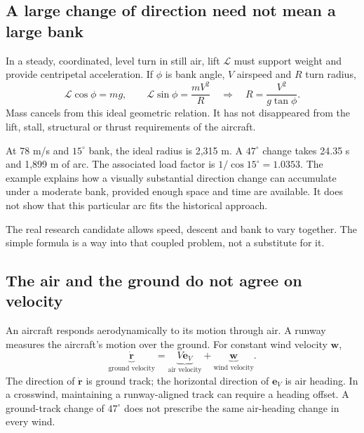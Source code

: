 \label{part:3}
\subsection*{A large change of direction need not mean a large bank}
In a steady, coordinated, level turn in still air, lift $\mathcal L$ must support weight and provide centripetal acceleration. If $\phi$ is bank angle, $V$ airspeed and $R$ turn radius,
\begin{equation}
\mathcal L\cos\phi=mg,\qquad \mathcal L\sin\phi=\frac{mV^2}{R}
\quad\Longrightarrow\quad R=\frac{V^2}{g\tan\phi}.
\label{eq:turn}
\end{equation}
Mass cancels from this ideal geometric relation. It has not disappeared from the lift, stall, structural or thrust requirements of the aircraft.


At 78 m/s and $15^\circ$ bank, the ideal radius is 2,315 m. A $47^\circ$ change takes 24.35 s and 1,899 m of arc. The associated load factor is $1/\cos15^\circ=1.0353$. The example explains how a visually substantial direction change can accumulate under a moderate bank, provided enough space and time are available. It does not show that this particular arc fits the historical approach.


The real research candidate allows speed, descent and bank to vary together. The simple formula is a way into that coupled problem, not a substitute for it.
\clearpage
\subsection*{The air and the ground do not agree on velocity}
An aircraft responds aerodynamically to its motion through air. A runway measures the aircraft's motion over the ground. For constant wind velocity $\mathbf w$,
\begin{equation}
\underbrace{\dot{\mathbf r}}_{\text{ground velocity}}
=\underbrace{V\mathbf e_V}_{\text{air velocity}}+\underbrace{\mathbf w}_{\text{wind velocity}}.
\label{eq:wind}
\end{equation}
The direction of $\dot{\mathbf r}$ is ground track; the horizontal direction of $\mathbf e_V$ is air heading. In a crosswind, maintaining a runway-aligned track can require a heading offset. A ground-track change of $47^\circ$ does not prescribe the same air-heading change in every wind.

